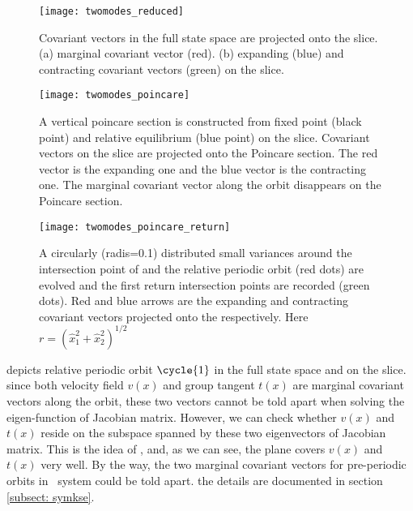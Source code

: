 \begin{figure}[h]
  \centering
  \texttt{[image: twomodes\_reduced]}
  \caption{Covariant vectors in the full state space are projected
    onto the slice. (a) marginal covariant vector (red). (b) expanding
    (blue) and contracting covariant vectors (green) on the slice.
  }
  \label{fig:twomodes_reduced}
\end{figure}

\begin{figure}[h]
  \centering
  \texttt{[image: twomodes\_poincare]}
  \caption{A vertical poincare section is constructed from fixed point
    (black point) and relative equilibrium
    (blue point) on
    the slice. Covariant vectors on the slice are projected onto the
    Poincare section. The red vector is the expanding one and the blue
    vector is the contracting one. The marginal covariant vector along
    the orbit disappears on the Poincare section.
  }
  \label{fig:twomodes_poincare}
\end{figure}

\begin{figure}[h]
  \centering
  \texttt{[image: twomodes\_poincare\_return]}
  \caption{A circularly (radis=0.1) distributed small variances around the intersection
    point of {\PoincSec} and the relative periodic orbit
     (red dots) are evolved and the first return intersection
    points are recorded (green dots). Red and blue arrows are the expanding
    and contracting
    covariant vectors projected onto the {\PoincSec} respectively.
    Here $r=(\hat{x}_{1}^2+\hat{x}_{2}^2)^{1/2}$
  }
  \label{fig:twomodes_poincare_return}
\end{figure}

 depicts relative periodic orbit
$\cycle{1}$ in the full state space and on the slice. since both
velocity field $v(x)$ and group tangent $t(x)$ are
marginal covariant vectors along the orbit, these two vectors cannot
be told apart when solving the eigen-function of Jacobian matrix. However,
we can check whether $v(x)$ and $t(x)$ reside on the subspace spanned by
these two eigenvectors of Jacobian matrix. This is the idea of
, and, as we can see, the plane covers $v(x)$ and
$t(x)$ very well. By the way, the two marginal covariant vectors for
pre-periodic orbits in \KS\ system could be told apart. the details are
documented in section \ref{subsect: symkse}.

